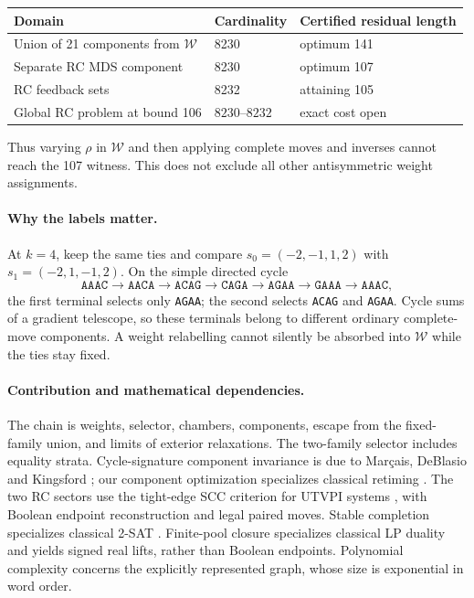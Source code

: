 \begin{center}
\begin{tabular}{lll}
\toprule Domain & Cardinality & Certified residual length\\
\midrule Union of 21 components from $\mathcal W$ & 8230 & optimum 141\\
Separate RC MDS component & 8230 & optimum 107\\
RC feedback sets & 8232 & attaining 105\\
Global RC problem at bound 106 & $8230$--$8232$ & exact cost open\\
\bottomrule
\end{tabular}
\end{center}
Thus varying $\rho$ in $\mathcal W$ and then applying complete moves and inverses cannot reach the 107 witness. This does not exclude all other antisymmetric weight assignments.

\paragraph{Why the labels matter.}
At $k=4$, keep the same ties and compare $s_0=(-2,-1,1,2)$ with $s_1=(-2,1,-1,2)$. On the simple directed cycle
\[
\texttt{AAAC}\to\texttt{AACA}\to\texttt{ACAG}\to\texttt{CAGA}\to\texttt{AGAA}\to\texttt{GAAA}\to\texttt{AAAC},
\]
the first terminal selects only \texttt{AGAA}; the second selects \texttt{ACAG} and \texttt{AGAA}. Cycle sums of a gradient telescope, so these terminals belong to different ordinary complete-move components. A weight relabelling cannot silently be absorbed into $\mathcal W$ while the ties stay fixed.

\paragraph{Contribution and mathematical dependencies.}
The chain is weights, selector, chambers, components, escape from the fixed-family union, and limits of exterior relaxations. The two-family selector includes equality strata. Cycle-signature component invariance is due to Mar\c cais, DeBlasio and Kingsford \cite{MarcaisDeBlasioKingsford2024}; our component optimization specializes classical retiming \cite{LeisersonSaxe1991}. The two RC sectors use the tight-edge SCC criterion for UTVPI systems \cite{LahiriMusuvathi2005}, with Boolean endpoint reconstruction and legal paired moves. Stable completion specializes classical 2-SAT \cite{AspvallPlassTarjan1979}. Finite-pool closure specializes classical LP duality \cite{BoydVandenberghe2004} and yields signed real lifts, rather than Boolean endpoints. Polynomial complexity concerns the explicitly represented graph, whose size is exponential in word order.

